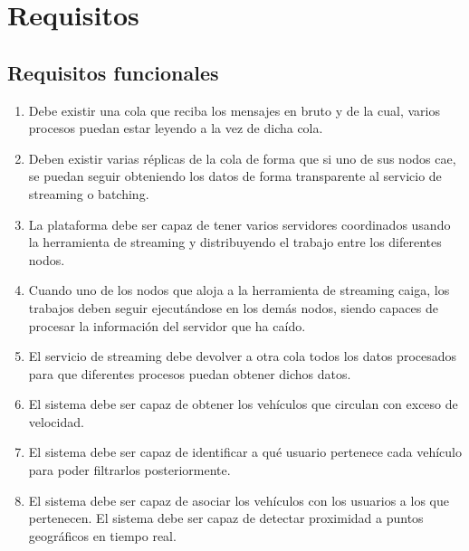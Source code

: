 
\section{Requisitos\label{requisitos}}

\subsection{Requisitos funcionales\label{RF}}
\begin{enumerate}
        \item Debe existir una cola que reciba los mensajes en bruto y de la cual, varios procesos puedan estar leyendo a la vez de dicha cola.
        \item Deben existir varias réplicas de la cola de forma que si uno de sus nodos cae, se puedan seguir obteniendo los datos de forma transparente al servicio de streaming o batching.
        \item La plataforma debe ser capaz de tener varios servidores coordinados usando la herramienta de streaming y distribuyendo el trabajo entre los diferentes nodos.
        \item Cuando uno de los nodos que aloja a la herramienta de streaming caiga, los trabajos deben seguir ejecutándose en los demás nodos, siendo capaces de procesar la información del servidor que ha caído.
        \item El servicio de streaming debe devolver a otra cola todos los datos procesados para que diferentes procesos puedan obtener dichos datos.
        \item El sistema debe ser capaz de obtener los vehículos que circulan con exceso de velocidad.
        \item El sistema debe ser capaz de identificar a qué usuario pertenece cada vehículo para poder filtrarlos posteriormente.
        \item El sistema debe ser capaz de asociar los vehículos con los usuarios a los que pertenecen.
El sistema debe ser capaz de detectar proximidad a puntos geográficos en tiempo real.
\end{enumerate}
